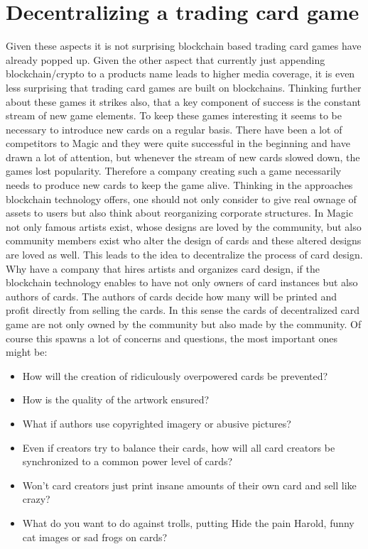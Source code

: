 \documentclass{article}
\begin{document}
\section{Decentralizing a trading card game}
%
Given these aspects it is not surprising blockchain based trading card games have already popped up. Given the other aspect that currently just appending blockchain/crypto to a products name leads to higher media coverage, it is even less surprising that trading card games are built on blockchains. Thinking further about these games it strikes also, that a key component of success is the constant stream of new game elements. To keep these games interesting it seems to be necessary to introduce new cards on a regular basis. There have been a lot of competitors to Magic and they were quite successful in the beginning and have drawn a lot of attention, but whenever the stream of new cards slowed down, the games lost popularity. Therefore a company creating such a game necessarily needs to produce new cards to keep the game alive. Thinking in the approaches blockchain technology offers, one should not only consider to give real ownage of assets to users but also think about reorganizing corporate structures. In Magic not only famous artists exist, whose designs are loved by the community, but also community members exist who alter the design of cards and these altered designs are loved as well. This leads to the idea to decentralize the process of card design. Why have a company that hires artists and organizes card design, if the blockchain technology enables to have not only owners of card instances but also authors of cards. The authors of cards decide how many will be printed and profit directly from selling the cards. In this sense the cards of decentralized card game are not only owned by the community but also made by the community. Of course this spawns a lot of concerns and questions, the most important ones might be:
%
\begin{itemize}
	\item How will the creation of ridiculously overpowered cards be prevented?
	\item How is the quality of the artwork ensured?
	\item What if authors use copyrighted imagery or abusive pictures?
	\item Even if creators try to balance their cards, how will all card creators be synchronized to a common power level of cards?
	\item Won't card creators just print insane amounts of their own card and sell like crazy?
	\item What do you want to do against trolls, putting Hide the pain Harold, funny cat images or sad frogs on cards?
\end{itemize}
\end{document}
